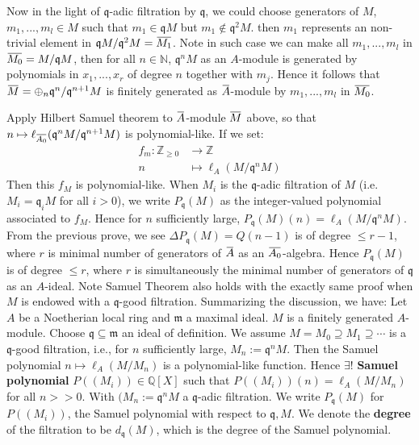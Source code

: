 \documentclass[12pt]{article}
\theoremstyle{definition}
\theoremstyle{plain}
\newcommand{\nat}{\mathbb{N}}
\newcommand{\rat}{\mathbb{Q}}
\newcommand{\z}{\mathbb{Z}}
\newcommand{\overbar}[1]{\mkern 1.5mu\overline{\mkern-1.5mu#1\mkern-1.5mu}\mkern 1.5mu}
\renewcommand{\bar}{\overbar}
\begin{document}
\medskip
Now in the light of $\mathfrak{q}$-adic filtration by $\mathfrak{q}$, we could choose generators of $M$, $m_1, ..., m_l\in M$ such that $m_1\in \mathfrak{q}M$ but $m_1\notin \mathfrak{q}^2M$. then $m_1$ represents an non-trivial element in $\mathfrak{q}M/\mathfrak{q}^2M=\bar{M_1}$. Note in such case we can make all $m_1, ..., m_l$ in $\bar{M_0}=M/\mathfrak{q}M$, then for all $n\in \nat$, $\mathfrak{q}^nM$ as an $A$-module is generated by polynomials in $x_1,..., x_r$ of degree $n$ together with $m_j$. Hence it follows that $\bar{M}=\oplus_n \mathfrak{q}^n/\mathfrak{q}^{n+1}M$ is finitely generated as $\bar{A}$-module by $m_1, ..., m_l$ in $\bar{M_0}$.

\medskip
Apply Hilbert Samuel theorem to $\bar{A}$-module $\bar{M}$ above, so that $n\mapsto \ell_{\bar{A_0}} (\mathfrak{q}^nM/ \mathfrak{q}^{n+1}M)$ is polynomial-like. If we set:
\begin{align*}
  f_m:\z_{\geq 0}&\to \z\\
  n &\mapsto \ell_A(M/\mathfrak{q}^nM)
\end{align*}
Then this $f_M$ is polynomial-like.\qedhere
When $M_i$ is the $\mathfrak{q}$-adic filtration of $M$ (i.e. $M_i = \mathfrak{q}_iM$ for all $i > 0$), we write $P_\mathfrak{q}(M)$ as the integer-valued polynomial associated to $f_M$. Hence for $n$ sufficiently large, $P_\mathfrak{q}(M)(n)=\ell_A(M/\mathfrak{q}^nM)$. From the previous prove, we see $\Delta P_\mathfrak{q}(M)=Q(n-1)$ is of degree $\leq r-1$, where $r$ is minimal number of generators of $\bar{A}$ as an $\bar{A_0}$-algebra. Hence $P_\mathfrak{q}(M)$ is of degree $\leq r$, where $r$ is simultaneously the minimal number of generators of $\mathfrak{q}$ as an $A$-ideal.
\Rmk Note Samuel Theorem also holds with the exactly same proof when $M$ is endowed with a $\mathfrak{q}$-good filtration.
Summarizing the discussion, we have:
\Theo[Samuel] Let $A$ be a Noetherian local ring and $\mathfrak{m}$ a maximal ideal. $M$ is a finitely generated $A$-module. Choose $\mathfrak{q}\subseteq \mathfrak{m}$ an ideal of definition. We assume $M=M_0\supseteq M_1\supseteq \cdots$ is a $\mathfrak{q}$-good filtration, i.e., for $n$ sufficiently large, $M_n:=\mathfrak{q}^nM$. Then the Samuel polynomial $n\mapsto \ell_A(M/M_n)$ is a polynomial-like function. Hence $\exists !$ \textbf{Samuel polynomial} $P((M_i))\in \rat[X]$ such that $P((M_i))(n)=\ell_A(M/M_n)$ for all $n>>0$.
\Def With $(M_n:=\mathfrak{q}^n M$ a $\mathfrak{q}$-adic filtration. We write $P_\mathfrak{q}(M)$ for $P((M_i))$, the Samuel polynomial with respect to $\mathfrak{q}, M$. We denote the \textbf{degree} of the filtration to be $d_\mathfrak{q}(M)$, which is the degree of the Samuel polynomial.
\end{document}
